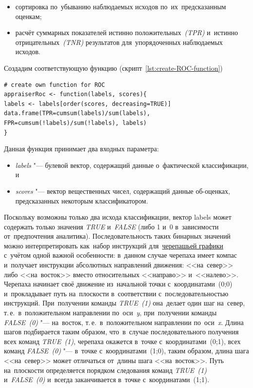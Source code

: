 \documentclass[]{scrreprt}
\begin{document}
\begin{itemize}
	\item сортировка по~убыванию наблюдаемых исходов по~их~предсказанным оценкам;
	\item расчёт суммарных показателей истинно положительных~\emph{(TPR)} и~истинно отрицательных~\emph{(TNR)} результатов для~упорядоченных наблюдаемых исходов.
\end{itemize}
Создадим соответствующую функцию (скрипт~\ref{lst:create-ROC-function})
%
\begin{lstlisting}[float, caption = Создание функции для~расчёта TPR и~FPR, firstnumber=1, label= lst:create-ROC-function-R]
# create own function for ROC
appraiserRoc <- function(labels, scores){
labels <- labels[order(scores, decreasing=TRUE)]
data.frame(TPR=cumsum(labels)/sum(labels),
FPR=cumsum(!labels)/sum(!labels), labels)
} 
\end{lstlisting}
%
Данная функция принимает два входных параметра:
\begin{itemize}
	\item \emph{labels} "--- булевой вектор, содержащий данные о~фактической классификации, и
	\item \emph{scores} "--- вектор вещественных чисел, содержащий данные об-оценках, предсказанных некоторым классификатором.
\end{itemize}
Поскольку возможны только два исхода классификации, вектор labels может содержать только значения \emph{TRUE} и~\emph{FALSE} (либо 1 и~0 в~зависимости от~предпочтения аналитика). Последовательность таких бинарных значений можно интерпретировать как~набор инструкций для~\href{https://en.wikipedia.org/wiki/Turtle_graphics}{черепашьей графики}~\cite{Wiki:turtle-graphics} с~учётом одной важной особенности: в~данном случае черепаха имеет компас и~получает инструкции абсолютных направлений движения: <<на~север>> либо <<на~восток>> вместо относительных <<направо>> и~<<налево>>. Черепаха начинает своё движение из~начальной точки с~координатами~(0;0) и~прокладывает путь на~плоскости в~соответствии с~последовательностью инструкций. При~получении команды \emph{TRUE~(1)} она~делает один шаг на~север, т.\,е.~в~положительном направлении по~оси~\emph{y}, при~получении команды \emph{FALSE~(0)} "--- на~восток, т.\,е.~в~положительном направлении по~оси~\emph{x}. Длина шагов подбирается таким образом, что~в~случае последовательного получения всех команд \emph{TRUE~(1)}, черепаха окажется в~точке с~координатами~(0;1), всех команд \emph{FALSE~(0)} "--- в~точке с~координатами~(1;0), таким образом, длина шага <<на~север>> может отличаться от~длины шага <<на~восток>>. Путь на~плоскости определяется порядком следования команд \emph{TRUE~(1)} и~\emph{FALSE~(0)} и~всегда заканчивается в~точке с~координатами~(1;1).
\end{document}
